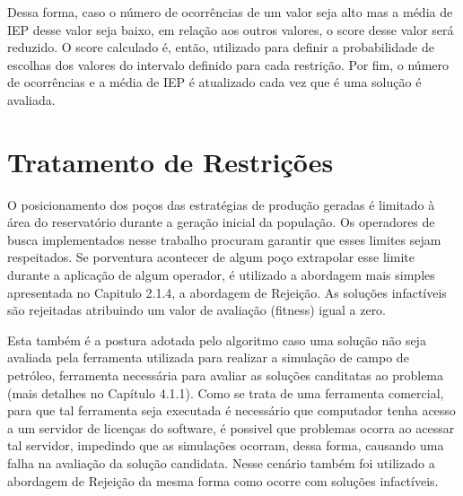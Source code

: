 Dessa forma, caso o número de ocorrências de um valor seja alto mas a média de IEP desse valor seja baixo, em relação aos outros valores, o score desse valor será reduzido. O score calculado é, então, utilizado para definir a probabilidade de escolhas dos valores do intervalo definido para cada restrição. Por fim, o número de ocorrências e a média de IEP é atualizado cada vez que é uma solução é avaliada.

\section{Tratamento de Restrições}

O posicionamento dos poços das estratégias de produção geradas é limitado à área do reservatório durante a geração inicial da população. Os operadores de busca implementados nesse trabalho procuram garantir que esses limites sejam respeitados. Se porventura acontecer de algum poço extrapolar esse limite durante a aplicação de algum operador, é utilizado a abordagem mais simples apresentada no Capitulo 2.1.4, a abordagem de Rejeição. As soluções infactíveis são rejeitadas atribuindo um valor de avaliação (fitness) igual a zero.

 
Esta também é a postura adotada pelo algoritmo caso uma solução não seja avaliada pela ferramenta utilizada para realizar a simulação de campo de petróleo, ferramenta necessária para avaliar as soluções canditatas ao problema (mais detalhes no Capítulo 4.1.1). Como se trata de uma ferramenta comercial, para que tal ferramenta seja executada é necessário que computador tenha acesso a um servidor de licenças do software, é possivel que problemas ocorra ao acessar tal servidor, impedindo que as simulações ocorram, dessa forma, causando uma falha na avaliação da solução candidata. Nesse cenário também foi utilizado a abordagem de Rejeição da mesma forma como ocorre com soluções infactíveis.